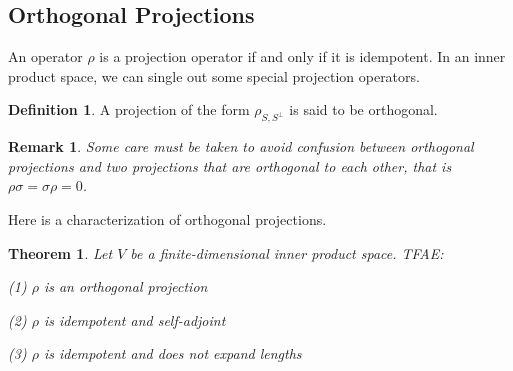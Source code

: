 \documentclass{book}
\newtheorem{theorem}{Theorem}[section]
\newtheorem*{remark}{Remark}
\theoremstyle{definition}
\newtheorem{definition}{Definition}[section]
\begin{document}
\subsection{Orthogonal Projections}
An operator $\rho$ is a projection operator if and only if it is idempotent. In an inner product space, we can single out some special projection operators.
\begin{definition}
A projection of the form $\rho_{S,S^\perp}$ is said to be orthogonal.
\end{definition}
\begin{remark}
Some care must be taken to avoid confusion between orthogonal projections and two projections that are orthogonal to each other, that is $\rho\sigma=\sigma\rho=0$.
\end{remark}
Here is a characterization of orthogonal projections.
\begin{theorem}
Let $V$ be a finite-dimensional inner product space. TFAE:\par
(1) $\rho$ is an orthogonal projection\par
(2) $\rho$ is idempotent and self-adjoint\par
(3) $\rho$ is idempotent and does not expand lengths
\end{theorem}
\end{document}
